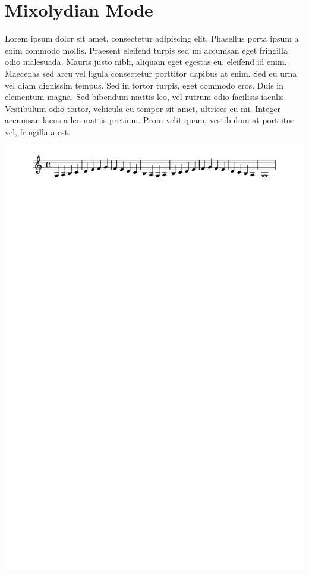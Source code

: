 \documentclass[11pt]{article}
\begin{document}
\section*{Mixolydian Mode}
\label{sec:org4a1a57c}

Lorem ipsum dolor sit amet, consectetur adipiscing elit. Phasellus
porta ipsum a enim commodo mollis. Praesent eleifend turpis sed mi
accumsan eget fringilla odio malesuada. Mauris justo nibh, aliquam
eget egestas eu, eleifend id enim. Maecenas sed arcu vel ligula
consectetur porttitor dapibus at enim. Sed eu urna vel diam dignissim
tempus. Sed in tortor turpis, eget commodo eros. Duis in elementum
magna. Sed bibendum mattis leo, vel rutrum odio facilisis iaculis.
Vestibulum odio tortor, vehicula eu tempor sit amet, ultrices eu mi.
Integer accumsan lacus a leo mattis pretium. Proin velit quam,
vestibulum at porttitor vel, fringilla a est.

\begin{center}
\includegraphics[width=.9\linewidth]{mixolydian.pdf}
\end{center}
\end{document}
